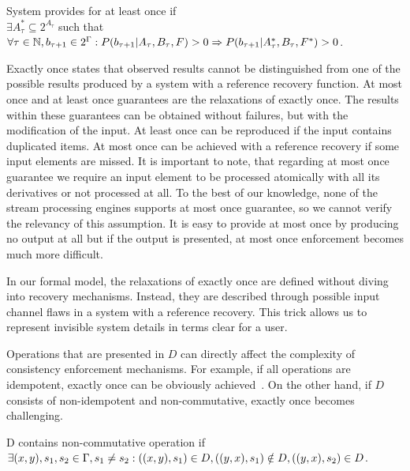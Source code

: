 \begin{definition}{System provides for at least once}
if \\
$\exists{A^{*}_{\tau}\subseteq{2^{A_{\tau}}}}$ such that \\
$\forall{\tau \in \mathbb{N}, {b_{\tau+1} \in 2^{\Gamma}}}: P(b_{\tau+1}|A_{\tau},B_\tau,F)>0 \Rightarrow \\ P(b_{\tau+1}|A^{*}_{\tau},B_\tau,F^{*})>0$.
\end{definition}

Exactly once states that observed results cannot be distinguished from one of the possible results produced by a system with a reference recovery function. At most once and at least once guarantees are the relaxations of exactly once. The results within these guarantees can be obtained without failures, but with the modification of the input. At least once can be reproduced if the input contains duplicated items. At most once can be achieved with a reference recovery if some input elements are missed. It is important to note, that regarding at most once guarantee we require an input element to be processed atomically with all its derivatives or not processed at all. To the best of our knowledge, none of the stream processing engines supports at most once guarantee, so we cannot verify the relevancy of this assumption. It is easy to provide at most once by producing no output at all but if the output is presented, at most once enforcement becomes much more difficult.  

In our formal model, the relaxations of exactly once are defined without diving into recovery mechanisms. Instead, they are described through possible input channel flaws in a system with a reference recovery. This trick allows us to represent invisible system details in terms clear for a user.

Operations that are presented in $D$ can directly affect the complexity of consistency enforcement mechanisms. For example, if all operations are idempotent, exactly once can be obviously achieved~\cite{Akidau:2013:MFS:2536222.2536229}. On the other hand, if $D$ consists of non-idempotent and non-commutative, exactly once becomes challenging.

\begin{definition}{D contains non-commutative operation}
if\\ 
$\exists (x,y), s_1, s_2 \in \Gamma, s_1 \neq s_2: \\ ((x,y),s_1)\in D, \\ ((y,x),s_1)\notin D, \\ ((y,x),s_2)\in D$.
\end{definition}


